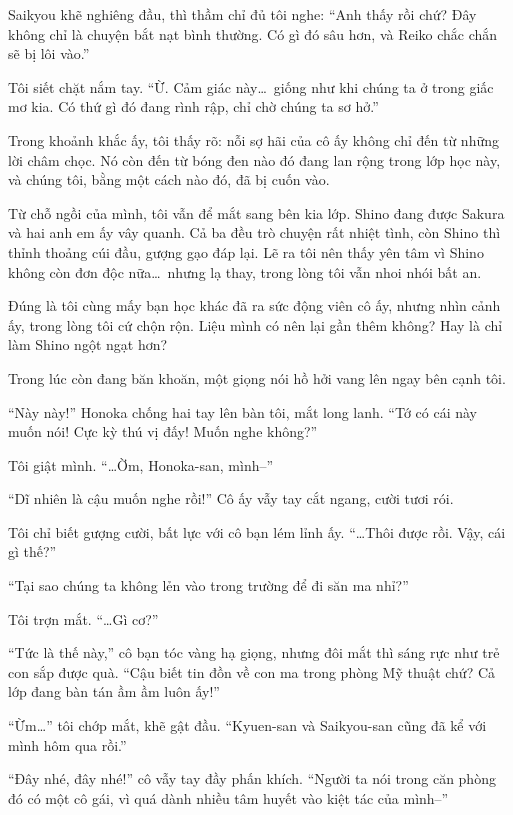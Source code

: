 \documentclass[../main.tex]{subfiles}
\begin{document}
Saikyou khẽ nghiêng đầu, thì thầm chỉ đủ tôi nghe: ``Anh thấy rồi chứ? Đây không chỉ là chuyện bắt nạt bình thường. Có gì đó sâu hơn, và Reiko chắc chắn sẽ bị lôi vào.''

Tôi siết chặt nắm tay. ``Ừ. Cảm giác này\dots\ giống như khi chúng ta ở trong giấc mơ kia. Có thứ gì đó đang rình rập, chỉ chờ chúng ta sơ hở.''

Trong khoảnh khắc ấy, tôi thấy rõ: nỗi sợ hãi của cô ấy không chỉ đến từ những lời châm chọc. Nó còn đến từ bóng đen nào đó đang lan rộng trong lớp học này, và chúng tôi, bằng một cách nào đó, đã bị cuốn vào.


Từ chỗ ngồi của mình, tôi vẫn để mắt sang bên kia lớp. Shino đang được Sakura và hai anh em ấy vây quanh. Cả ba đều trò chuyện rất nhiệt tình, còn Shino thì thỉnh thoảng cúi đầu, gượng gạo đáp lại. Lẽ ra tôi nên thấy yên tâm vì Shino không còn đơn độc nữa\dots\ nhưng lạ thay, trong lòng tôi vẫn nhoi nhói bất an.

Đúng là tôi cùng mấy bạn học khác đã ra sức động viên cô ấy, nhưng nhìn cảnh ấy, trong lòng tôi cứ chộn rộn. Liệu mình có nên lại gần thêm không? Hay là chỉ làm Shino ngột ngạt hơn?

Trong lúc còn đang băn khoăn, một giọng nói hồ hởi vang lên ngay bên cạnh tôi.

``Này này!'' Honoka chống hai tay lên bàn tôi, mắt long lanh. ``Tớ có cái này muốn nói! Cực kỳ thú vị đấy! Muốn nghe không?''

Tôi giật mình. ``\dots Ờm, Honoka-san, mình--''

``Dĩ nhiên là cậu muốn nghe rồi!'' Cô ấy vẫy tay cắt ngang, cười tươi rói.

Tôi chỉ biết gượng cười, bất lực với cô bạn lém lỉnh ấy. ``\dots Thôi được rồi. Vậy, cái gì thế?''

``Tại sao chúng ta không lẻn vào trong trường để đi săn ma nhỉ?''

Tôi trợn mắt. ``\dots Gì cơ?''

``Tức là thế này,'' cô bạn tóc vàng hạ giọng, nhưng đôi mắt thì sáng rực như trẻ con sắp được quà. ``Cậu biết tin đồn về con ma trong phòng Mỹ thuật chứ? Cả lớp đang bàn tán ầm ầm luôn ấy!''

``Ừm\dots'' tôi chớp mắt, khẽ gật đầu. ``Kyuen-san và Saikyou-san cũng đã kể với mình hôm qua rồi.''

``Đây nhé, đây nhé!'' cô vẫy tay đầy phấn khích. ``Người ta nói trong căn phòng đó có một cô gái, vì quá dành nhiều tâm huyết vào kiệt tác của mình--''
\end{document}
